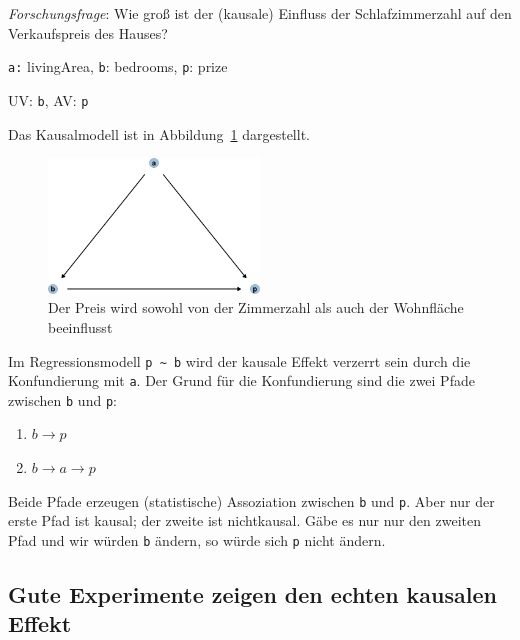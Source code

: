 \documentclass[
  a4paper,
  DIV=11]{scrreprt}
\providecommand{\tightlist}{%
  \setlength{\itemsep}{0pt}\setlength{\parskip}{0pt}}\usepackage{longtable,booktabs,array}
\theoremstyle{definition}
\theoremstyle{remark}
\begin{document}
\emph{Forschungsfrage}: Wie groß ist der (kausale) Einfluss der
Schlafzimmerzahl auf den Verkaufspreis des Hauses?

\texttt{a:} livingArea, \texttt{b}: bedrooms, \texttt{p}: prize

UV: \texttt{b}, AV: \texttt{p}

Das Kausalmodell ist in Abbildung~\ref{fig-dag-don1} dargestellt.

\begin{figure}

{\centering \includegraphics[width=0.5\textwidth,height=\textheight]{./kausal_files/figure-pdf/fig-dag-don1-1.pdf}

}

\caption{\label{fig-dag-don1}Der Preis wird sowohl von der Zimmerzahl
als auch der Wohnfläche beeinflusst}

\end{figure}

Im Regressionsmodell \texttt{p\ \textasciitilde{}\ b} wird der kausale
Effekt verzerrt sein durch die Konfundierung mit \texttt{a}. Der Grund
für die Konfundierung sind die zwei Pfade zwischen \texttt{b} und
\texttt{p}:

\begin{enumerate}
\def\labelenumi{\arabic{enumi}.}
\tightlist
\item
  \(b \rightarrow p\)
\item
  \(b \rightarrow a \rightarrow p\)
\end{enumerate}

Beide Pfade erzeugen (statistische) Assoziation zwischen \texttt{b} und
\texttt{p}. Aber nur der erste Pfad ist kausal; der zweite ist
nichtkausal. Gäbe es nur nur den zweiten Pfad und wir würden \texttt{b}
ändern, so würde sich \texttt{p} nicht ändern.

\hypertarget{gute-experimente-zeigen-den-echten-kausalen-effekt}{%
\subsection{Gute Experimente zeigen den echten kausalen
Effekt}\label{gute-experimente-zeigen-den-echten-kausalen-effekt}}
\end{document}
